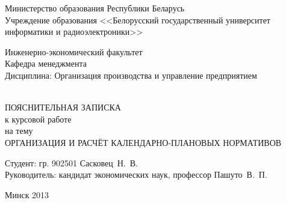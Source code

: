 \begin{titlepage}
  \begin{center}
    Министерство образования Республики Беларусь\\[0.4em]
    Учреждение образования <<Белорусский государственный университет информатики и радиоэлектроники>>\\[3.5em]

    \begin{minipage}{\textwidth}
      \begin{flushleft}
          Инженерно-экономический факультет\\[1em]

          Кафедра менеджмента\\[1em]

          Дисциплина: Организация производства и управление предприятием
      \end{flushleft}
    \end{minipage}\\[3em]

    {ПОЯСНИТЕЛЬНАЯ ЗАПИСКА}\\
    {к курсовой работе}\\
    {на тему}\\[1em]
    \MakeTextUppercase{Организация и расчёт календарно-плановых нормативов}\\[1em]



    \vspace{8em}

    \begin{flushright}
        \begin{minipage}{9.3cm}
            Студент:  гр. 902501 Сасковец~Н.~В.\\[1.4em]

            Руководитель: кандидат экономических наук, профессор Пашуто~В.~П.
        \end{minipage}
    \end{flushright}

    \vfill
    {\normalsize Минск 2013}
  \end{center}
\end{titlepage}
